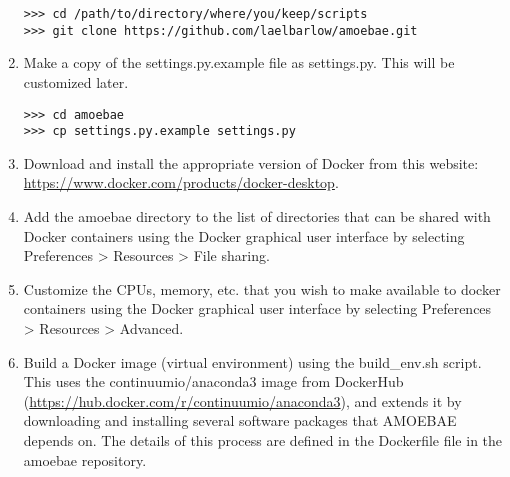 \documentclass[12pt,letterpaper]{article}
\begin{document}
\begin{linenumbers}
\begin{enumerate}
\begin{lstlisting}
>>> cd /path/to/directory/where/you/keep/scripts
>>> git clone https://github.com/laelbarlow/amoebae.git
\end{lstlisting}


%



\item Make a copy of the settings.py.example file as settings.py. This will be
    customized later. 

\begin{lstlisting}
>>> cd amoebae
>>> cp settings.py.example settings.py
\end{lstlisting}


\item Download and install the appropriate version of Docker from this website:
    \url{https://www.docker.com/products/docker-desktop}.


\item Add the amoebae directory to the list of directories that can be shared
    with Docker containers using the Docker graphical user interface by
    selecting Preferences > Resources > File sharing.


\item Customize the CPUs, memory, etc. that you wish to make available to
    docker containers using the Docker graphical user interface by
    selecting Preferences > Resources > Advanced.


\item Build a Docker image (virtual environment) using the build\_env.sh
    script. This uses the continuumio/anaconda3 image from DockerHub
    (\url{https://hub.docker.com/r/continuumio/anaconda3}), and extends it by
    downloading and installing several software packages that AMOEBAE depends
    on. The details of this process are defined in the Dockerfile file in
    the amoebae repository. 


\end{enumerate}
\end{linenumbers}
\end{document}
